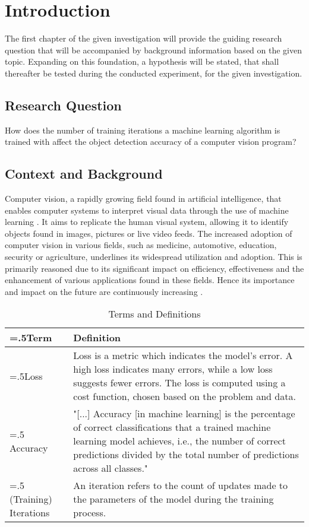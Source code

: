 

\section{Introduction}
The first chapter of the given investigation will provide the guiding research question that will be accompanied by background information based on the given topic. Expanding on this foundation, a hypothesis will be stated, that shall thereafter be tested during the conducted experiment, for the given investigation.

\subsection{Research Question}
How does the number of training iterations a machine learning algorithm is trained with affect the object detection accuracy of a computer vision program?

\subsection{Context and Background}
Computer vision, a rapidly growing field found in artificial intelligence, that enables computer systems to interpret visual data through the use of machine learning \parencite[pp.~2--5]{Sultana2020}. It aims to replicate the human visual system, allowing it to identify objects found in images, pictures or live video feeds. The increased adoption of computer vision in various fields, such as medicine, automotive, education, security or agriculture, underlines its widespread utilization and adoption. This is primarily reasoned due to its significant impact on efficiency, effectiveness and the enhancement of various applications found in these fields. Hence its importance and impact on the future are continuously increasing \parencite[pp.~1--3, 85--95]{Szeliski2022}. 

\begin{table}[h]
\centering
\begin{tabularx}{\textwidth}{|>{\hsize=.5\hsize}X|>{\hsize=1.5\hsize}X|}
\hline
\textbf{Term} & \textbf{Definition} \\
\hline
Loss & 
Loss is a metric which indicates the model's error. A high loss indicates many errors, while a low loss suggests fewer errors. 
The loss is computed using a cost function, chosen based on the problem and data. \parencite{Baeldung2022}
\\
\hline
Accuracy &
"[...] Accuracy [in machine learning] is the percentage of correct classifications that a trained machine learning model achieves, i.e., 
the number of correct predictions divided by the total number of predictions across all classes." \parencite{Iguazio}
\\
\hline
(Training) Iterations & 
An iteration refers to the count of updates made to the parameters of the model during the training process. \parencite{Paperspace}
\\
\hline

\end{tabularx}
\caption{Terms and Definitions}
\label{tab:terms-and-definitions}
\end{table}

